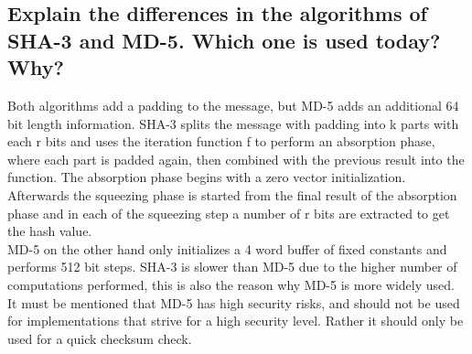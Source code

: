 \documentclass{report}
\begin{document}
		\subsection{Explain the differences in the algorithms of SHA-3 and MD-5. Which one is used today? Why?}
		\startsubsection
			Both algorithms add a padding to the message, but MD-5 adds an additional 64 bit length information. SHA-3 splits the message with padding into k parts with each r bits and uses the iteration function f to perform an absorption phase, where each part is padded again, then combined with the previous result into the function. The absorption phase begins with a zero vector initialization. Afterwards the squeezing phase is started from the final result of the absorption phase and in each of the squeezing step a number of r bits are extracted to get the hash value. \\
			MD-5 on the other hand only initializes a 4 word buffer of fixed constants and performs 512 bit steps.  SHA-3 is slower than MD-5 due to the higher number of computations performed, this is also the reason why MD-5 is more widely used. It must be mentioned that MD-5 has high security risks, and should not be used for implementations that strive for a high security level. Rather it should only be used for a quick checksum check.
		\closesection
	\closesection
\end{document}
